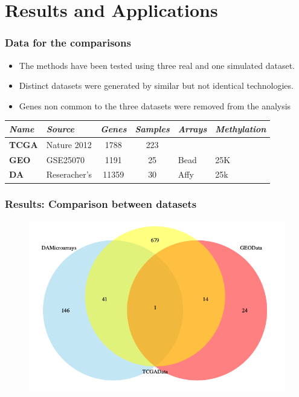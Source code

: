\documentclass[handout]{beamer}
\begin{document}
\section{Results and Applications}

\begin{frame}
	\frametitle{Data for the comparisons}
	\begin{itemize}
		\item The methods have been tested using three real and one simulated dataset.
		\item Distinct datasets were generated by similar but not identical technologies.
		\item Genes non common to the three datasets were removed from the analysis
	\end{itemize}
\begin{table}[]
	\begin{tabular}{|l|l|c|c|l|l|}
		\hline
		\textit{Name} & \textit{Source} & \multicolumn{1}{l|}{\textit{Genes}} & \multicolumn{1}{l|}{\textit{Samples}} & \textit{Arrays}   & \textit{Methylation} \\ \hline
		\textbf{TCGA} & Nature 2012     & 1788                                & 223                                   &                   &                      \\ \hline
		\textbf{GEO}  & GSE25070        & 1191                                & 25                                    & Bead & 25K       \\ \hline
		\textbf{DA}   & Reseracher's    & 11359                               & 30                                    & Affy & 25k       \\ \hline
	\end{tabular}
\end{table}	
\end{frame}

\begin{frame}
	\frametitle{Results: Comparison between datasets}
\begin{center}
	\begin{figure}[h]          
		\includegraphics[height=0.8\textheight]{images/genesInCommonBetweenHEURISTICselections.png}
	\end{figure}
\end{center}
\end{frame}
\end{document}
